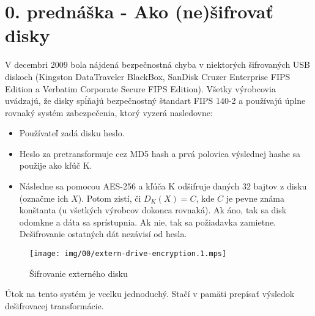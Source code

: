 \section{0. prednáška - Ako (ne)šifrovať disky}

V decembri 2009 bola nájdená bezpečnostná chyba v niektorých šifrovaných USB diskoch
(Kingston DataTraveler BlackBox, SanDisk Cruzer Enterprise FIPS Edition a
Verbatim Corporate Secure FIPS Edition). Všetky výrobcovia uvádzajú, že disky
spĺňajú bezpečnostný štandart FIPS 140-2 a používajú úplne rovnaký systém zabezpečenia,
ktorý vyzerá nasledovne:
\begin{itemize}
\item Používateľ zadá disku heslo.
\item Heslo za pretransformuje cez MD5 hash a prvá polovica výslednej hashe sa použije ako kľúč K.
\item Následne sa pomocou AES-256 a kľúča K odšifruje daných 32 bajtov z disku (označme ich $X$). Potom zistí, či
$D_K(X)=C$, kde $C$ je pevne známa konštanta (u všetkých výrobcov dokonca rovnaká). Ak áno, tak sa disk odomkne a dáta sa sprístupnia.
Ak nie, tak sa požiadavka zamietne. Dešifrovanie ostatných dát nezávisí od hesla.
\end{itemize}

\begin{figure}[htp]
    \centering
    \texttt{[image: img/00/extern-drive-encryption.1.mps]}
    \label{fig:extern_drive_encryption}
    \caption{Šifrovanie externého disku}
\end{figure}

Útok na tento systém je vcelku jednoduchý. Stačí v pamäti prepísať výsledok dešifrovacej transformácie. 



